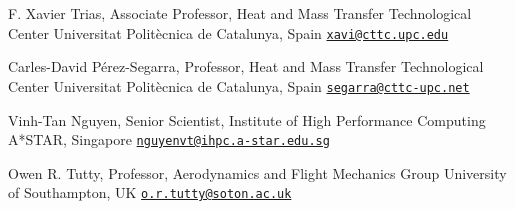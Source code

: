 \documentclass[line]{res}
\newenvironment{p1}
  {\begin{adjustwidth}{-16pt}{0pt}
  \vspace{1pt}}
  {\end{adjustwidth}}
\begin{document}
\begin{resume}
\begin{p1}
F. Xavier Trias, Associate Professor, Heat and Mass Transfer Technological Center\newline
Universitat Polit\`{e}cnica de Catalunya, Spain\newline
\href{mailto:xavi@cttc.upc.edu}{\texttt{xavi@cttc.upc.edu}}

Carles-David P\'{e}rez-Segarra, Professor, Heat and Mass Transfer Technological Center\newline
Universitat Polit\`{e}cnica de Catalunya, Spain\newline
\href{mailto:segarra@cttc-upc.net}{\texttt{segarra@cttc-upc.net}}

Vinh-Tan Nguyen, Senior Scientist, Institute of High Performance Computing\newline
A*STAR, Singapore\newline
\href{mailto:nguyenvt@ihpc.a-star.edu.sg}{\texttt{nguyenvt@ihpc.a-star.edu.sg}}

Owen R. Tutty, Professor, Aerodynamics and Flight Mechanics Group\newline
University of Southampton, UK\newline
\href{mailto:o.r.tutty@soton.ac.uk}{\texttt{o.r.tutty@soton.ac.uk}}

\end{p1}
\end{resume}
\end{document}
